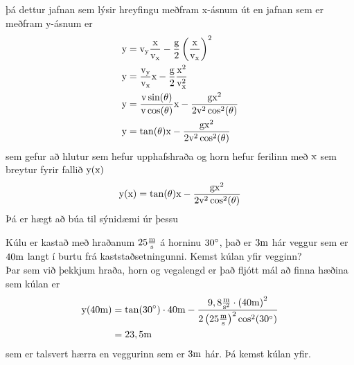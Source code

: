 þá dettur jafnan sem lýsir hreyfingu meðfram x-ásnum út en jafnan sem er meðfram
y-ásnum er
\begin{align*}
	\text{y} &= \textrm{v}_\text{y} \frac{\text{x}}{\textrm{v}_\text{x}} 
		- \frac{\textrm{g}}{2}  \left( \frac{\text{x}}{\textrm{v}_\text{x}} \right)^2 \\
	\text{y}	&= \frac{\textrm{v}_\text{y}}{\textrm{v}_\text{x}} \text{x}
		- \frac{\textrm{g}}{2} \frac{\text{x}^2}{\textrm{v}_\text{x}^2} \\
	\text{y}	&= \frac{\textrm{v} \sin(\theta)}{\textrm{v} \cos(\theta)} \text{x}
		- \frac{\textrm{g} \text{x}^2}{2\textrm{v}^2 \cos^2(\theta)} \\
	\text{y}	&= \tan(\theta) \text{x}
		- \frac{\textrm{g} \text{x}^2}{2\textrm{v}^2 \cos^2(\theta)}
\end{align*}
sem gefur að hlutur sem hefur upphafshraða og horn hefur ferilinn með $\text{x}$
sem breytur fyrir fallið $\text{y}(\text{x})$
\begin{equation}
	\text{y}(\text{x}) = \tan(\theta) \text{x}
		- \frac{\textrm{g} \text{x}^2}{2\textrm{v}^2 \cos^2(\theta)}
\end{equation}
Þá er hægt að búa til sýnidæmi úr þessu
\begin{formalexample}
Kúlu er kastað með hraðanum $25 \frac{\textrm{m}}{\textrm{s}}$ á horninu $30 ^{\circ}$, það er 
$3 \textrm{m}$ hár veggur sem er $40 \textrm{m}$ langt í burtu frá kaststaðsetningunni.
Kemst kúlan yfir vegginn?
\\[4 ex]
Þar sem við þekkjum hraða, horn og vegalengd er það fljótt mál að finna hæðina
sem kúlan er
\begin{align*}
	\text{y}(40 \textrm{m})	&= \tan(30 ^{\circ}) \cdot 40 \textrm{m}
		- \frac{9,8 \frac{\textrm{m}}{\textrm{s}^2} \cdot \left(40 \textrm{m}\right)^2}{2 \left( 25 \frac{\textrm{m}}{\textrm{s}} \right)^2 \cos^2(30 ^{\circ})} \\
		&= 23,5 \textrm{m}
\end{align*}
sem er talsvert hærra en veggurinn sem er $3 \textrm{m}$ hár. Þá kemst kúlan yfir.
\end{formalexample}

